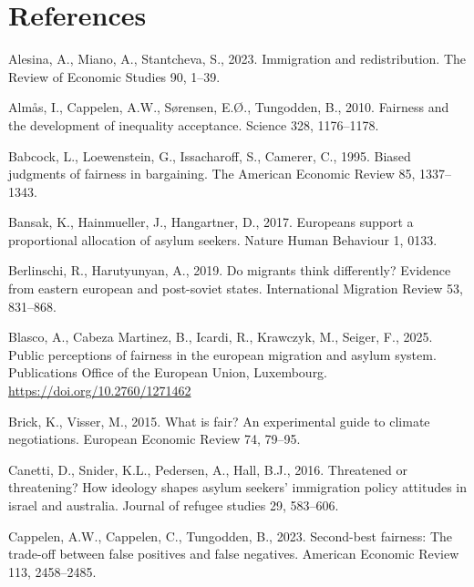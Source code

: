 \documentclass[
  12pt,
  a4paper,
]{article}
\newlength{\cslhangindent}
\newenvironment{CSLReferences}[2] %
 {\begin{list}{}{%
  \setlength{\itemindent}{0pt}
  \setlength{\leftmargin}{0pt}
  \setlength{\parsep}{0pt}
  \ifodd #1
   \setlength{\leftmargin}{\cslhangindent}
   \setlength{\itemindent}{-1\cslhangindent}
  \fi
  \setlength{\itemsep}{#2\baselineskip}}}
 {\end{list}}
\begin{document}
\section*{References}\label{references}

\protect{}\label{refs}
\begin{CSLReferences}{1}{0}
Alesina, A., Miano, A., Stantcheva, S., 2023. Immigration and redistribution. The Review of Economic Studies 90, 1--39.

Almås, I., Cappelen, A.W., Sørensen, E.Ø., Tungodden, B., 2010. Fairness and the development of inequality acceptance. Science 328, 1176--1178.

Babcock, L., Loewenstein, G., Issacharoff, S., Camerer, C., 1995. Biased judgments of fairness in bargaining. The American Economic Review 85, 1337--1343.

Bansak, K., Hainmueller, J., Hangartner, D., 2017. Europeans support a proportional allocation of asylum seekers. Nature Human Behaviour 1, 0133.

Berlinschi, R., Harutyunyan, A., 2019. Do migrants think differently? Evidence from eastern european and post-soviet states. International Migration Review 53, 831--868.

Blasco, A., Cabeza Martinez, B., Icardi, R., Krawczyk, M., Seiger, F., 2025. Public perceptions of fairness in the european migration and asylum system. Publications Office of the European Union, Luxembourg. \url{https://doi.org/10.2760/1271462}

Brick, K., Visser, M., 2015. What is fair? An experimental guide to climate negotiations. European Economic Review 74, 79--95.

Canetti, D., Snider, K.L., Pedersen, A., Hall, B.J., 2016. Threatened or threatening? How ideology shapes asylum seekers' immigration policy attitudes in israel and australia. Journal of refugee studies 29, 583--606.

Cappelen, A.W., Cappelen, C., Tungodden, B., 2023. Second-best fairness: The trade-off between false positives and false negatives. American Economic Review 113, 2458--2485.


\end{CSLReferences}
\end{document}
